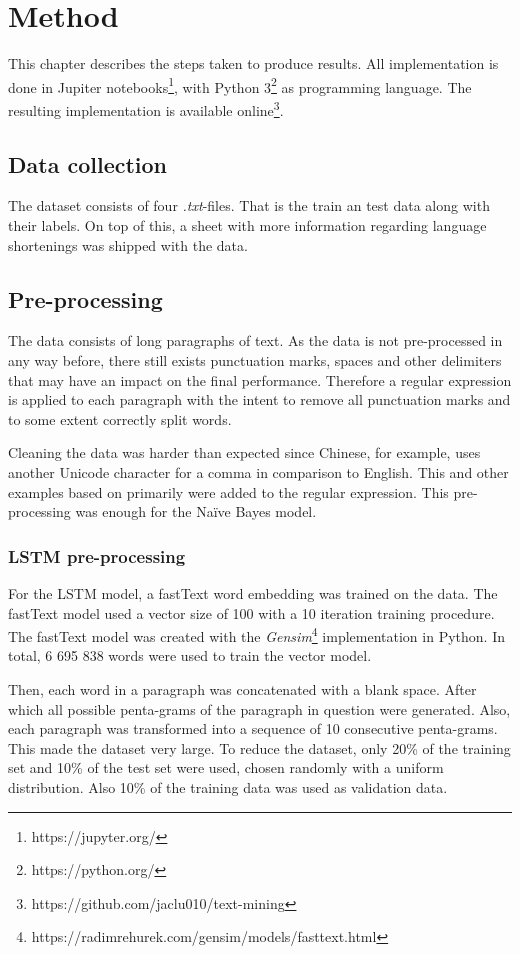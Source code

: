 \documentclass[conference]{IEEEtran}
\begin{document}
\section{Method}
This chapter describes the steps taken to produce results. All implementation is done in Jupiter notebooks\footnote{https://jupyter.org/}, with Python 3\footnote{https://python.org/} as programming language. The resulting implementation is available online\footnote{https://github.com/jaclu010/text-mining}.

\subsection{Data collection}
The dataset consists of four \textit{.txt}-files. That is the train an test data along with their labels. On top of this, a sheet with more information regarding language shortenings was shipped with the data.

\subsection{Pre-processing}
The data consists of long paragraphs of text. As the data is not pre-processed in any way before, there still exists punctuation marks, spaces and other delimiters that may have an impact on the final performance. Therefore a regular expression is applied to each paragraph with the intent to remove all punctuation marks and to some extent correctly split words. 

Cleaning the data was harder than expected since Chinese, for example, uses another Unicode character for a comma in comparison to English. This and other examples based on primarily \cite{wikc, wikl, wikt} were added to the regular expression. This pre-processing was enough for the Naïve Bayes model. 

\subsubsection{LSTM pre-processing}
For the LSTM model, a fastText word embedding was trained on the data. The fastText model used a vector size of 100 with a 10 iteration training procedure. The fastText model was created with the \textit{Gensim}\footnote{https://radimrehurek.com/gensim/models/fasttext.html} implementation in Python. In total, 6 695 838 words were used to train the vector model.

Then, each word in a paragraph was concatenated with a blank space. After which all possible penta-grams of the paragraph in question were generated. Also, each paragraph was transformed into a sequence of 10 consecutive penta-grams. This made the dataset very large. To reduce the dataset, only 20\% of the training set and 10\% of the test set were used, chosen randomly with a uniform distribution. Also 10\% of the training data was used as validation data.
\end{document}
